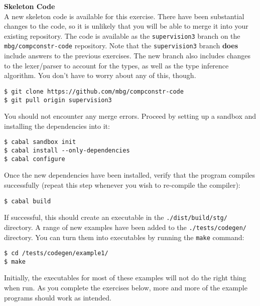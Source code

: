 \documentclass[10pt,a4paper]{exam} %
\begin{document}
\begin{mdframed}
\textbf{Skeleton Code}\\
A new skeleton code is available for this exercise. There have been substantial changes to the code, so it is unlikely that you will be able to merge it into your existing repository. The code is available as the \texttt{supervision3} branch on the \texttt{mbg/compconstr-code} repository. Note that the \texttt{supervision3} branch \textbf{does} include answers to the previous exercises. The new branch also includes changes to the lexer/parser to account for the types, as well as the type inference algorithm. You don't have to worry about any of this, though.
\begin{verbatim}
$ git clone https://github.com/mbg/compconstr-code
$ git pull origin supervision3
\end{verbatim}
You should not encounter any merge errors. Proceed by setting up a sandbox and installing the dependencies into it:
\begin{verbatim}
$ cabal sandbox init
$ cabal install --only-dependencies
$ cabal configure
\end{verbatim}
Once the new dependencies have been installed, verify that the program compiles successfully (repeat this step whenever you wish to re-compile the compiler):
\begin{verbatim}
$ cabal build
\end{verbatim}
If successful, this should create an executable in the \texttt{./dist/build/stg/} directory. A range of new examples have been added to the \texttt{./tests/codegen/} directory. You can turn them into executables by running the \texttt{make} command:
\begin{verbatim}
$ cd /tests/codegen/example1/
$ make
\end{verbatim} 
Initially, the executables for most of these examples will not do the right thing when run. As you complete the exercises below, more and more of the example programs should work as intended.
\end{mdframed}
\end{document}
